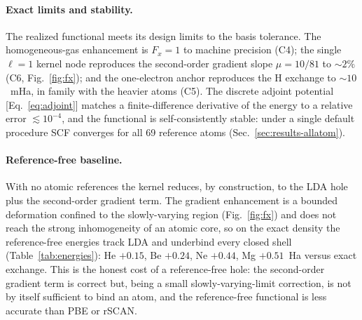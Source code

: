 \documentclass[aps,prb,reprint,superscriptaddress,nofootinbib]{revtex4-2}
\begin{document}
\paragraph*{Exact limits and stability.} The realized functional meets its design limits
to the basis tolerance. The homogeneous-gas enhancement is $F_x=1$ to machine precision
(C4); the single $\ell=1$ kernel node reproduces the second-order gradient slope
$\mu=10/81$ to $\sim2\%$ (C6, Fig.~\ref{fig:fx}); and the one-electron anchor reproduces the
H exchange to $\sim10$~mHa, in family with the heavier atoms (C5). The discrete adjoint
potential [Eq.~\eqref{eq:adjoint}] matches a finite-difference derivative of the energy
to a relative error $\lesssim10^{-4}$, and the functional is self-consistently stable:
under a single default procedure SCF converges for all 69 reference atoms
(Sec.~\ref{sec:results-allatom}).

\paragraph*{Reference-free baseline.} With no atomic references the kernel reduces, by
construction, to the LDA hole plus the second-order gradient term. The gradient enhancement
is a bounded deformation confined to the slowly-varying region (Fig.~\ref{fig:fx}) and
does not reach the strong inhomogeneity of an atomic core, so on the exact density the
reference-free energies track LDA and underbind every closed shell (Table~\ref{tab:energies}):
He $+0.15$, Be $+0.24$, Ne $+0.44$, Mg $+0.51$~Ha versus exact exchange. This is the honest
cost of a reference-free hole: the second-order gradient term is correct but, being a small
slowly-varying-limit correction, is not by itself sufficient to bind an atom, and the
reference-free functional is less accurate than PBE or rSCAN.
\end{document}
